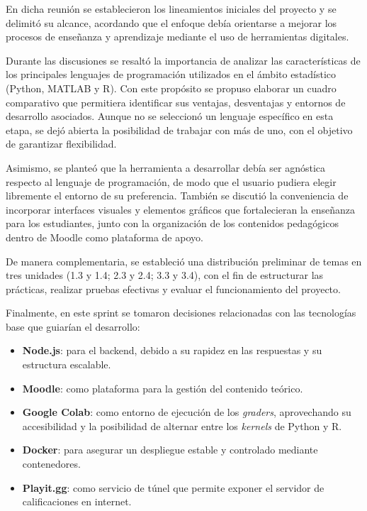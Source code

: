 \documentclass[letter,oneside,12pt,spanish]{report}
\begin{document}
En dicha reunión se establecieron los lineamientos iniciales del proyecto y se delimitó su alcance, acordando que el enfoque debía orientarse a mejorar los procesos de enseñanza y aprendizaje mediante el uso de herramientas digitales.  

Durante las discusiones se resaltó la importancia de analizar las características de los principales lenguajes de programación utilizados en el ámbito estadístico (Python, MATLAB y R). Con este propósito se propuso elaborar un cuadro comparativo que permitiera identificar sus ventajas, desventajas y entornos de desarrollo asociados. Aunque no se seleccionó un lenguaje específico en esta etapa, se dejó abierta la posibilidad de trabajar con más de uno, con el objetivo de garantizar flexibilidad.  

Asimismo, se planteó que la herramienta a desarrollar debía ser agnóstica respecto al lenguaje de programación, de modo que el usuario pudiera elegir libremente el entorno de su preferencia. También se discutió la conveniencia de incorporar interfaces visuales y elementos gráficos que fortalecieran la enseñanza para los estudiantes, junto con la organización de los contenidos pedagógicos dentro de Moodle como plataforma de apoyo.  

De manera complementaria, se estableció una distribución preliminar de temas en tres unidades (1.3 y 1.4; 2.3 y 2.4; 3.3 y 3.4), con el fin de estructurar las prácticas, realizar pruebas efectivas y evaluar el funcionamiento del proyecto.  

Finalmente, en este sprint se tomaron decisiones relacionadas con las tecnologías base que guiarían el desarrollo:  

\begin{itemize}
	\item \textbf{Node.js}: para el backend, debido a su rapidez en las respuestas y su estructura escalable.  
	\item \textbf{Moodle}: como plataforma para la gestión del contenido teórico.  
	\item \textbf{Google Colab}: como entorno de ejecución de los \textit{graders}, aprovechando su accesibilidad y la posibilidad de alternar entre los \textit{kernels} de Python y R.  
	\item \textbf{Docker}: para asegurar un despliegue estable y controlado mediante contenedores.  
	\item \textbf{Playit.gg}: como servicio de túnel que permite exponer el servidor de calificaciones en internet.  
\end{itemize}
\end{document}
